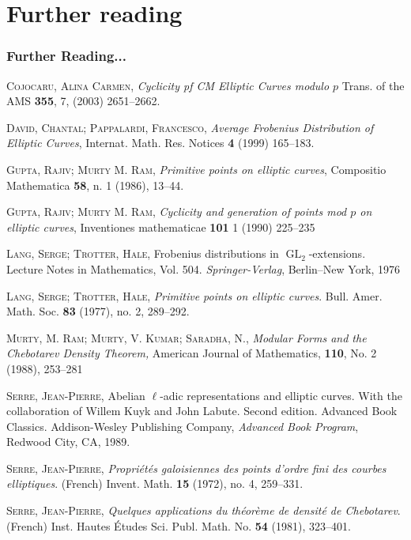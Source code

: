 \documentclass[10pt,handout]{beamer} %
\theoremstyle{definition}
\begin{document}
\section{Further reading}
\begin{frame}
\frametitle{Further Reading...}
\begin{scriptsize}
\begin{thebibliography}{99}
\textsc{Cojocaru, Alina Carmen}, 
\textit{Cyclicity pf CM Elliptic Curves modulo $p$}
Trans. of the AMS \textbf{355}, 7, (2003) 2651--2662.

\textsc{David, Chantal; Pappalardi, Francesco},
\textit{Average Frobenius Distribution of Elliptic Curves}, 
Internat. Math. Res. Notices \textbf{4} (1999) 165--183.

\textsc{Gupta, Rajiv; Murty M. Ram},
\textit{Primitive points on elliptic curves},
Compositio Mathematica \textbf{58}, n. 1 (1986), 13--44.

\textsc{Gupta, Rajiv; Murty M. Ram},
\textit{Cyclicity and generation of points mod $p$ on elliptic curves},
Inventiones mathematicae \textbf{101} 1 (1990)  225--235

\textsc{Lang, Serge; Trotter, Hale},
Frobenius distributions in $\operatorname{GL}_{2}$-extensions.
Lecture Notes in Mathematics, Vol. 504. \textit{Springer-Verlag}, Berlin--New York, 1976

\textsc{Lang, Serge; Trotter, Hale},
\textit{Primitive points on elliptic curves}. Bull. Amer. Math. Soc. 
\textbf{83} (1977), no. 2, 289--292.

\textsc{Murty, M. Ram; Murty, V. Kumar; Saradha, N.},
\textit{Modular Forms and the Chebotarev Density Theorem,}
American Journal of Mathematics, \textbf{110}, No. 2 (1988), 253--281

\textsc{Serre, Jean-Pierre}, 
Abelian $\ell$-adic representations and elliptic curves. 
With the collaboration of Willem Kuyk and John Labute. 
Second edition. Advanced Book Classics. Addison-Wesley Publishing Company, 
\textit{Advanced Book Program}, Redwood City, CA, 1989.

\textsc{Serre, Jean-Pierre},
\textit{Propri\'et\'es galoisiennes des points d'ordre fini des courbes elliptiques}. 
(French) Invent. Math. \textbf{15} (1972), no. 4, 259--331.

\textsc{Serre, Jean-Pierre},
\textit{Quelques applications du th\'eor\`eme de densit\'e de Chebotarev}. (French) 
Inst. Hautes \'Etudes Sci. Publ. Math. No. \textbf{54} (1981), 323--401. 

\end{thebibliography}
\end{scriptsize}
\end{frame}
\end{document}
